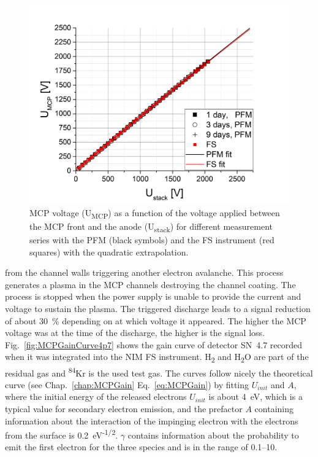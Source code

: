 	\begin{figure}[h!] %
		\centering
		\includegraphics[width=.8\textwidth]{Experiments/PFM_UstackUmccp_TimeEvol.png}
		\caption{MCP voltage (U\textsubscript{MCP}) as a function of the voltage applied between the MCP front and the anode (U\textsubscript{stack}) for different measurement series with the PFM (black symbols) and the FS instrument (red squares) with the quadratic extrapolation.}
		\label{fig:PFMUstackUmcpTimeEvol}
	\end{figure}
	from the channel walls triggering another electron avalanche. This process generates a plasma in the MCP channels destroying the channel coating. The process is stopped when the power supply is unable to provide the current and voltage to sustain the plasma. The triggered discharge leads to a signal reduction of about 30~\% depending on at which voltage it appeared. The higher the MCP voltage was at the time of the discharge, the higher is the signal loss.\\
	Fig.~\ref{fig:MCPGainCurve4p7} shows the gain curve of detector SN~4.7 recorded when it was integrated into the NIM FS instrument. H\textsubscript{2} and H\textsubscript{2}O are part of the residual gas and \textsuperscript{84}Kr is the used test gas. The curves follow nicely the theoretical curve (see Chap.~\ref{chap:MCPGain} Eq.~\eqref{eq:MCPGain}) by fitting $U_{init}$ and $A$, where the initial energy of the released electrons $U_{init}$ is about 4~eV, which is a typical value for secondary electron emission, and the prefactor $A$ containing information about the interaction of the impinging electron with the electrons from the surface is 0.2~eV\textsuperscript{-1/2}. $\gamma$ contains information about the probability to emit the first electron for the three species and is in the range of 0.1--10.\\
